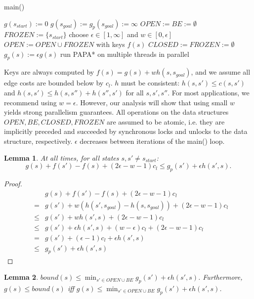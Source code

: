 \documentclass[letterpaper]{article}
\newtheorem{lemma}{Lemma}
\begin{document}
\begin{algorithm}
\caption{main()}
\label{alg:main}
\begin{algorithmic}
\STATE $g(s_{start}) := 0$
\STATE $g(s_{goal}) := g_p(s_{goal}) := \infty$
\STATE $OPEN := BE := \emptyset$
\STATE $FROZEN := \{s_{start}\}$
\REPEAT
\STATE choose $\epsilon \in [1,\infty]$ and $w \in [0,\epsilon]$
\STATE $OPEN := OPEN \cup FROZEN$ with keys $f(s)$
\STATE $CLOSED := FROZEN := \emptyset$
\STATE $g_p(s) := \epsilon g(s)$
\ENDFOR
\STATE run PAPA* on multiple threads in parallel
\end{algorithmic}
\end{algorithm}

Keys are always computed by $f(s) = g(s) + wh(s,s_{goal})$, and we assume all edge costs are bounded below by $c_l$. $h$ must be consistent: $h(s,s') \le c(s,s')$ and $h(s,s') \le h(s,s'')+h(s'',s')$ for all $s,s',s''$. For most applications, we recommend using $w = \epsilon$. However, our analysis will show that using small $w$ yields strong parallelism guarantees. All operations on the data structures $OPEN,BE,CLOSED,FROZEN$ are assumed to be atomic, i.e. they are implicitly preceded and succeeded by synchronous locks and unlocks to the data structure, respectively. $\epsilon$ decreases between iterations of the main() loop.

\begin{lemma}
\label{lem:indep}
At all times, for all states $s,s' \ne s_{start}$:
\[g(s) + f(s') - f(s) + (2\epsilon-w-1) c_l \le g_p(s') + \epsilon h(s',s).\]
\end{lemma}

\begin{proof}
\begin{eqnarray*}
&&g(s) + f(s') - f(s) + (2\epsilon-w-1) c_l
\\&=& g(s') + w(h(s',s_{goal}) - h(s,s_{goal})) + (2\epsilon-w-1) c_l
\\&\le& g(s') + wh(s',s) + (2\epsilon-w-1) c_l
\\&\le& g(s') + \epsilon h(s',s) + (w-\epsilon) c_l + (2\epsilon-w-1) c_l
\\&=& g(s') + (\epsilon-1) c_l + \epsilon h(s',s)
\\&\le& g_p(s') + \epsilon h(s',s)
\end{eqnarray*}
\end{proof}

\begin{lemma}
\label{lem:bound}
$bound(s) \le \min_{s'\in OPEN \cup BE} g_p(s') + \epsilon h(s',s)$. Furthermore, $g(s) \le bound(s)$ iff $g(s) \le \min_{s'\in OPEN \cup BE} g_p(s') + \epsilon h(s',s)$.
\end{lemma}
\end{document}
